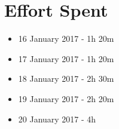\section{Effort Spent}

\begin{itemize}
	\item 16 January 2017 - 1h 20m
	\item 17 January 2017 - 1h 20m
	\item 18 January 2017 - 2h 30m
	\item 19 January 2017 - 2h 20m
	\item 20 January 2017 - 4h
\end{itemize}
